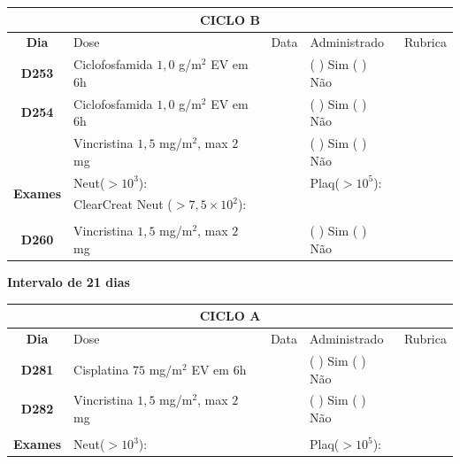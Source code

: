\documentclass[11pt,a4paper,oldfontcommands]{memoir}
\begin{document}
\begin{center}
    \begin{table}[H]
    \begin{tabular}{p{1cm}p{6cm}|p{1cm}|p{3cm}|p{2.5cm}}
    \hline
	\multicolumn{5}{c}{\textbf{CICLO B}}\\
	\hline
    \multicolumn{1}{c|}{\multirow{1}{*}{\textbf{Dia}}}&{Dose}&{Data}&{Administrado}&{Rubrica} \\
    \hline
    \multicolumn{1}{c|}{\multirow{1}{*}{\textbf{D253}}}&{Ciclofosfamida \(1,0\) g/m\(^2\) EV em 6h}&&{(  ) Sim (  ) Não}&\\
    \multicolumn{1}{c|}{\multirow{1}{*}{\textbf{D254}}}&{Ciclofosfamida \(1,0\) g/m\(^2\) EV em 6h}&&{(  ) Sim (  ) Não}&\\
    \multicolumn{1}{c|}{\multirow{1}{*}{\textbf{}}}&{Vincristina \(1,5\) mg/m\(^2\), max \(2\) mg}&&{(  ) Sim (  ) Não}&\\
    \hline
    \multicolumn{1}{c|}{\multirow{2}{*}{\textbf{Exames}}}&\multicolumn{2}{l|}{Neut(\(>10^3\)):}&{Plaq(\(>10^5\)):}&\\
    \cline{2-5}
    \multicolumn{1}{c|}{\multirow{2}{*}{{}}}&\multicolumn{2}{l|}{ClearCreat Neut (\(>7,5\times10^2\)):}&{}&{}\\
    \hline
    \\
    \hline
    \multicolumn{1}{c|}{\multirow{1}{*}{\textbf{D260}}}&{Vincristina \(1,5\) mg/m\(^2\), max \(2\) mg}&&{(  ) Sim (  ) Não}&\\
    \hline
\end{tabular}
\end{table}
\textbf{Intervalo de 21 dias}
\begin{table}[H]
\begin{tabular}{p{1cm}p{6cm}|p{1cm}|p{3cm}|p{2.5cm}}
	\hline
	\multicolumn{5}{c}{\textbf{CICLO A}}\\
\hline
    \multicolumn{1}{c|}{\multirow{1}{*}{\textbf{Dia}}}&{Dose}&{Data}&{Administrado}&{Rubrica} \\
    \hline
    \multicolumn{1}{c|}{\multirow{1}{*}{\textbf{D281}}}&{Cisplatina \(75\) mg/m\(^2\) EV em 6h}&&{(  ) Sim (  ) Não}&\\
    \multicolumn{1}{c|}{\multirow{1}{*}{\textbf{D282}}}&{Vincristina \(1,5\) mg/m\(^2\), max \(2\) mg}&&{(  ) Sim (  ) Não}&\\
    \multicolumn{1}{c|}{\multirow{1}{*}{\textbf{}}}&&&&\\
    \hline
    \multicolumn{1}{c|}{\multirow{2}{*}{\textbf{Exames}}}&\multicolumn{2}{l|}{Neut(\(>10^3\)):}&{Plaq(\(>10^5\)):}&\\

\end{tabular}
\end{table}
\end{center}
\end{document}
